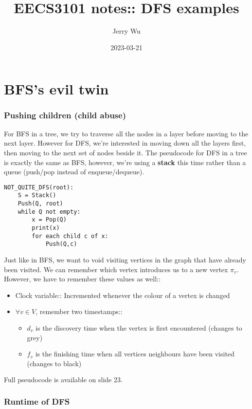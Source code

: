 \documentclass[12pt]{book}
\title{EECS3101 notes:: DFS examples}
\author{Jerry Wu}
\date{2023-03-21}
\begin{document}
\maketitle
\chapter*{BFS's evil twin}

\subsection*{Pushing children (child abuse)}

For BFS in a tree, we try to traverse all the nodes in a layer before moving to the next layer. However for DFS, we're interested in moving down all the layers first, then moving to the next set of nodes beside it. The pseudocode for DFS in a tree is exactly the same as BFS, however, we're using a \textbf{stack} this time rather than a queue (push/pop instead of enqueue/dequeue).

\begin{lstlisting}
NOT_QUITE_DFS(root):
    S = Stack()
    Push(Q, root)
    while Q not empty:
        x = Pop(Q)
        print(x)
        for each child c of x:
            Push(Q,c)
\end{lstlisting}

Just like in BFS, we want to void visiting vertices in the graph that have already been visited. We can remember which vertex introduces us to a new vertex $\pi_v$. However, we have to remember these values as well::

\begin{itemize}
    \item Clock variable:: Incremented whenever the colour of a vertex is changed
    \item $\forall v\in V$, remember two timestamps::
    \begin{itemize}
        \item $d_v$ is the discovery time when the vertex is first encountered (changes to grey)
        \item $f_v$ is the finishing time when all vertices neighbours have been visited (changes to black)
    \end{itemize}
\end{itemize}

Full pseudocode is available on slide 23.

\subsection*{Runtime of DFS}
\end{document}
